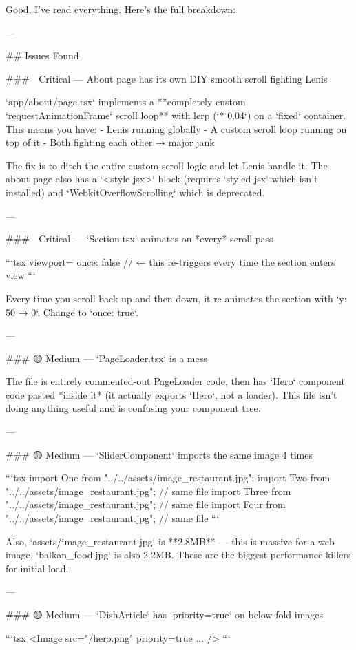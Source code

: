 

Good, I've read everything. Here's the full breakdown:

---

## Issues Found

### 🔴 Critical — About page has its own DIY smooth scroll fighting Lenis

`app/about/page.tsx` implements a **completely custom `requestAnimationFrame` scroll loop** with lerp (`* 0.04`) on a `fixed` container. This means you have:
- Lenis running globally
- A custom scroll loop running on top of it
- Both fighting each other → major jank

The fix is to ditch the entire custom scroll logic and let Lenis handle it. The about page also has a `<style jsx>` block (requires `styled-jsx` which isn't installed) and `WebkitOverflowScrolling` which is deprecated.

---

### 🔴 Critical — `Section.tsx` animates on *every* scroll pass

```tsx
viewport={{ once: false }} // ← this re-triggers every time the section enters view
```

Every time you scroll back up and then down, it re-animates the section with `y: 50 → 0`. Change to `once: true`.

---

### 🟡 Medium — `PageLoader.tsx` is a mess

The file is entirely commented-out PageLoader code, then has `Hero` component code pasted *inside it* (it actually exports `Hero`, not a loader). This file isn't doing anything useful and is confusing your component tree.

---

### 🟡 Medium — `SliderComponent` imports the same image 4 times

```tsx
import One from "../../assets/image_restaurant.jpg";
import Two from "../../assets/image_restaurant.jpg"; // same file
import Three from "../../assets/image_restaurant.jpg"; // same file
import Four from "../../assets/image_restaurant.jpg"; // same file
```

Also, `assets/image_restaurant.jpg` is **2.8MB** — this is massive for a web image. `balkan_food.jpg` is also 2.2MB. These are the biggest performance killers for initial load.

---

### 🟡 Medium — `DishArticle` has `priority={true}` on below-fold images

```tsx
<Image src="/hero.png" priority={true} ... />
```

